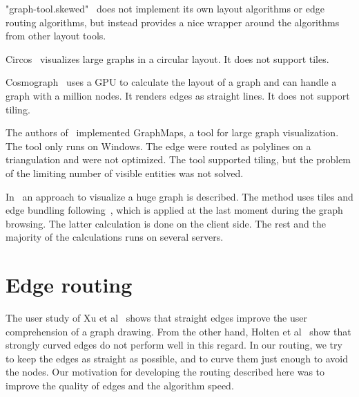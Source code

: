 \documentclass{llncs}
\begin{document}
"graph-tool.skewed"~\cite{skewed} does not implement its own layout algorithms or
edge routing algorithms, but instead provides a nice wrapper around the algorithms from
other layout tools.

Circos~\cite{circos} visualizes large graphs in a circular layout. It does not support tiles.


Cosmograph~\cite{cosmograph} uses a GPU to calculate the layout of a graph and can
handle a graph with a million nodes. It renders edges as straight lines.
It does not support tiling.

The authors of~\cite{nachmanson2015graphmaps} implemented GraphMaps, a tool for large graph visualization.
The tool only runs on Windows. The edge were routed as polylines on a triangulation and were not optimized.
The tool supported tiling, but the problem of the limiting number of visible entities was not solved.

In~\cite{perrot2018cornac} an approach to visualize a huge graph is described. The method uses tiles and
edge bundling following~\cite{hurter2012graph}, which is applied at the last moment during the graph browsing.
The latter calculation is done on the client side. The rest and the majority of the calculations runs on several servers.




\section{Edge routing}
The user study of Xu et al~\cite{xu2012user} shows that straight edges improve the user comprehension of a graph drawing.
From the other hand, Holten et al~\cite{holten2009user} show that strongly curved edges do not perform well in this regard.
In our routing, we try to keep the edges as straight as possible, and to curve them just enough to avoid the nodes.
Our motivation for developing the routing described here was to improve the quality of edges and the algorithm speed.
\end{document}
